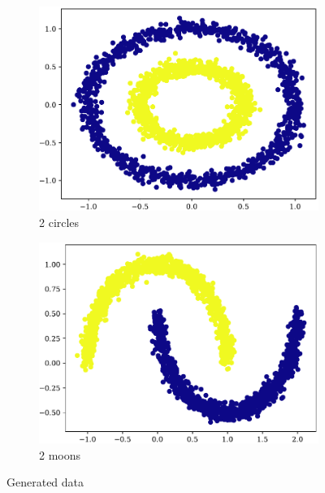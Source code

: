 \begin{figure}[hbtp]
\begin{subfigure}[b]{0.45\columnwidth}
        \includegraphics[width=\columnwidth]{../plots/circle_dbscan.pdf}
        \caption{2 circles}
        \label{subfig:circle-truth}
    \end{subfigure}
    \hspace{0.04\columnwidth}
    \begin{subfigure}[b]{0.45\columnwidth}
        \includegraphics[width=\columnwidth]{../plots/moons_dbscan.pdf}
        \caption{2 moons}
        \label{subfig:moons-truth}
    \end{subfigure}
    \caption{Generated data}
    \label{fig:truth-data}
\end{figure}

